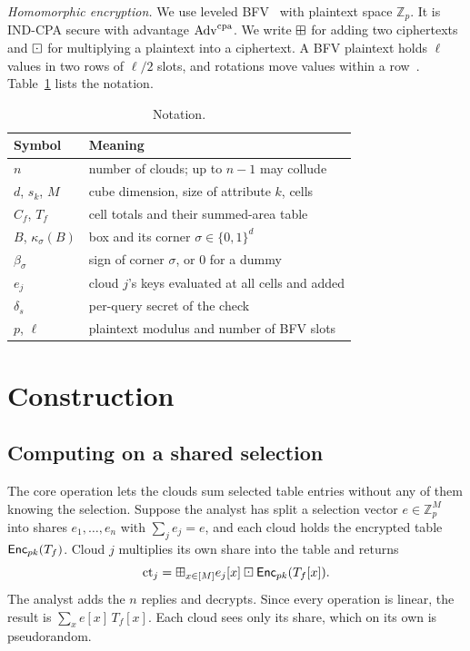 \documentclass[10pt,journal,compsoc]{IEEEtran}
\begin{document}
\emph{Homomorphic encryption.} We use leveled BFV~\cite{fan2012somewhat} with
plaintext space $\mathbb{Z}_p$. It is IND-CPA secure with advantage $\mathrm{Adv}^{\mathrm{cpa}}$.
We write $\boxplus$ for adding two ciphertexts and $\boxdot$ for multiplying a
plaintext into a ciphertext. A BFV plaintext holds $\ell$ values in two rows
of $\ell/2$ slots, and rotations move values within a
row~\cite{halevi2014algorithms}. Table~\ref{tab:notation} lists the notation.

\begin{table}[t]
\caption{Notation.}
\label{tab:notation}
\centering
\small
\begin{tabular}{@{}ll@{}}
\toprule
Symbol & Meaning \\
\midrule
$n$ & number of clouds; up to $n-1$ may collude \\
$d$, $s_k$, $M$ & cube dimension, size of attribute $k$, cells \\
$C_f$, $T_f$ & cell totals and their summed-area table \\
$B$, $\kappa_\sigma(B)$ & box and its corner $\sigma\in\{0,1\}^d$ \\
$\beta_\sigma$ & sign of corner $\sigma$, or $0$ for a dummy \\
$e_j$ & cloud $j$'s keys evaluated at all cells and added \\
$\delta_s$ & per-query secret of the check \\
$p$, $\ell$ & plaintext modulus and number of BFV slots \\
\bottomrule
\end{tabular}
\end{table}

\section{Construction}
\label{sec:construction}

\subsection{Computing on a shared selection}
\label{sec:oha}
The core operation lets the clouds sum selected table entries without any of
them knowing the selection. Suppose the analyst has split a selection vector
$e\in\mathbb{Z}_p^M$ into shares $e_1,\dots,e_n$ with $\sum_je_j=e$, and each
cloud holds the encrypted table $\mathsf{Enc}_{pk}(T_f)$. Cloud $j$ multiplies its own
share into the table and returns
\begin{equation}
\label{eq:contract}
\mathrm{ct}_j=\boxplus_{x\in[M]} e_j[x]\boxdot\mathsf{Enc}_{pk}(T_f[x]).
\end{equation}
The analyst adds the $n$ replies and decrypts. Since every operation is linear,
the result is $\sum_x e[x]\,T_f[x]$. Each cloud sees only its share, which on
its own is pseudorandom.
\end{document}

